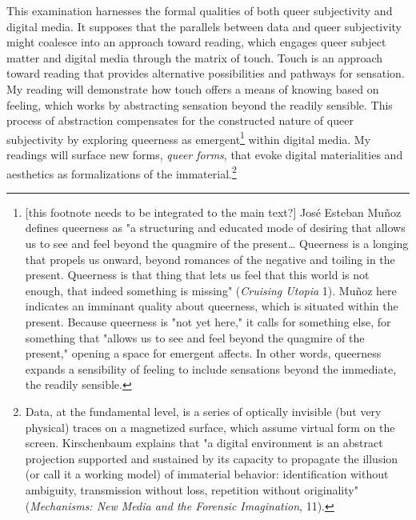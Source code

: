 \documentclass[11pt]{article}
\begin{document}
This examination harnesses the formal qualities of both queer
subjectivity and digital media. It supposes that the parallels between
data and queer subjectivity might coalesce into an approach toward
reading, which engages queer subject matter and digital media through
the matrix of touch. Touch is an approach toward reading that provides
alternative possibilities and pathways for sensation. My reading will
demonstrate how touch offers a means of knowing based on feeling,
which works by abstracting sensation beyond the readily sensible. This
process of abstraction compensates for the constructed nature of queer
subjectivity by exploring queerness as emergent\footnote{[this footnote needs to be integrated to the main text?] José
Esteban Muñoz defines queerness as "a structuring and educated mode of
desiring that allows us to see and feel beyond the quagmire of the
present\ldots{} Queerness is a longing that propels us onward, beyond
romances of the negative and toiling in the present. Queerness is that
thing that lets us feel that this world is not enough, that indeed
something is missing" (\emph{Cruising Utopia} 1). Muñoz here indicates an
imminant quality about queerness, which is situated within the
present. Because queerness is "not yet here," it calls for something
else, for something that "allows us to see and feel beyond the
quagmire of the present," opening a space for emergent affects. In
other words, queerness expands a sensibility of feeling to include
sensations beyond the immediate, the readily sensible.} within digital
media. My readings will surface new forms, \emph{queer forms}, that evoke
digital materialities and aesthetics as formalizations of the
immaterial.\footnote{Data, at the fundamental level, is a series of optically
invisible (but very physical) traces on a magnetized surface, which
assume virtual form on the screen. Kirschenbaum explains that "a
digital environment is an abstract projection supported and sustained
by its capacity to propagate the illusion (or call it a working model)
of immaterial behavior: identification without ambiguity, transmission
without loss, repetition without originality" (\emph{Mechanisms: New Media
and the Forensic Imagination}, 11).}
\end{document}
